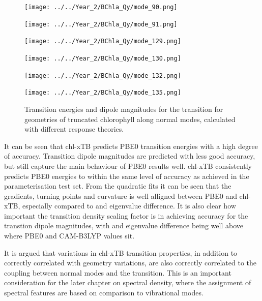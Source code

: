 \begin{figure}
    \centering
    \texttt{[image: ../../Year\_2/BChla\_Qy/mode\_90.png]}
    \label{fig:mode_90}
\end{figure}

\begin{figure}
    \centering
    \texttt{[image: ../../Year\_2/BChla\_Qy/mode\_91.png]}
    \label{fig:mode_91}
\end{figure}

\begin{figure}
    \centering
    \texttt{[image: ../../Year\_2/BChla\_Qy/mode\_129.png]}
    \label{fig:mode_129}
\end{figure}

\begin{figure}
    \centering
    \texttt{[image: ../../Year\_2/BChla\_Qy/mode\_130.png]}
    \label{fig:mode_130}
\end{figure}

\begin{figure}
    \centering
    \texttt{[image: ../../Year\_2/BChla\_Qy/mode\_132.png]}
    \label{fig:mode_132}
\end{figure}

\begin{figure}
    \centering
    \texttt{[image: ../../Year\_2/BChla\_Qy/mode\_135.png]}
    \label{fig:mode_135}
    \caption{Transition energies and dipole magnitudes for the \Qy transition for
    geometries of truncated chlorophyll along normal modes, calculated with different
    response theories.}
\end{figure}

It can be seen that chl-xTB predicts PBE0 transition energies with a high degree
of accuracy. Transition dipole magnitudes are predicted with less good accuracy,
but still capture the main behaviour of PBE0 results well. chl-xTB consistently 
predicts PBE0 energies to within the same level of accuracy as achieved in the 
parameterisation test set. From the quadratic fits it can be seen that the gradients, 
turning points and curvature is well alligned between PBE0 and chl-xTB, especially
compared to \dscf and eigenvalue difference. It is also clear how important the
transition density scaling factor is in achieving accuracy for the transtion dipole
magnitudes, with \dscf and eigenvalue difference being well above where PBE0 and
CAM-B3LYP values sit.

It is argued that variations in chl-xTB transition properties, in addition to correctly
correlated with geometry variations, are also correctly correlated to the coupling
between normal modes and the \Qy transition. This is an important consideration 
for the later chapter on spectral density, where the assignment of spectral features
are based on comparison to vibrational modes.

